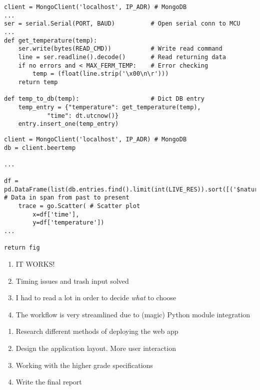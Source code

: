 \documentclass[aspectratio=169, 9pt]{uu-beamer}
\begin{document}
\begin{frame}[fragile]
    \begin{lstlisting}[caption={The Python script running from systemd}, label={sertodb}]
client = MongoClient('localhost', IP_ADR) # MongoDB
...
ser = serial.Serial(PORT, BAUD)          # Open serial conn to MCU
...
def get_temperature(temp):
    ser.write(bytes(READ_CMD))           # Write read command
    line = ser.readline().decode()       # Read returning data
    if no errors and < MAX_FERM_TEMP:    # Error checking
        temp = (float(line.strip('\x00\n\r')))
    return temp

def temp_to_db(temp):                    # Dict DB entry
    temp_entry = {"temperature": get_temperature(temp),
            "time": dt.utcnow()}
    entry.insert_one(temp_entry)
    \end{lstlisting}
\end{frame}

\begin{frame}[fragile]
    \begin{lstlisting}[caption={Getting data from DB and plotting using Plotly}, label={dbplot}]
client = MongoClient('localhost', IP_ADR) # MongoDB
db = client.beertemp

...

df = pd.DataFrame(list(db.entries.find().limit(int(LIVE_RES)).sort([('$natural',-1)]))) # Data in span from past to present
    trace = go.Scatter( # Scatter plot
        x=df['time'],
        y=df['temperature'])
...

return fig
    \end{lstlisting}
\end{frame}


\begin{frame}
\end{frame}

\begin{frame}
  \begin{enumerate}
    \item IT WORKS!
    \item Timing issues and trash input solved
    \item I had to read a lot in order to decide \textit{what} to choose
    \item The workflow is very streamlined due to (magic) Python module integration
  \end{enumerate}
\end{frame}
\begin{frame}
  \begin{enumerate}
    \item Research different methods of deploying the web app 
    \item Design the application layout. More user interaction
    \item Working with the higher grade specifications
    \item Write the final report
  \end{enumerate}
  
\end{frame}
\end{document}
